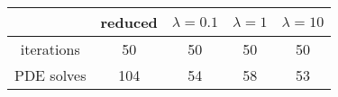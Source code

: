 \begin{tabular}{ccccc}
& reduced & $\lambda = 0.1$ & $\lambda = 1$ & $\lambda = 10$ \\
\hline
iterations & 50 & 50 & 50 & 50 \\
PDE solves & 104 & 54 & 58 & 53 \\
\hline
\end{tabular}
